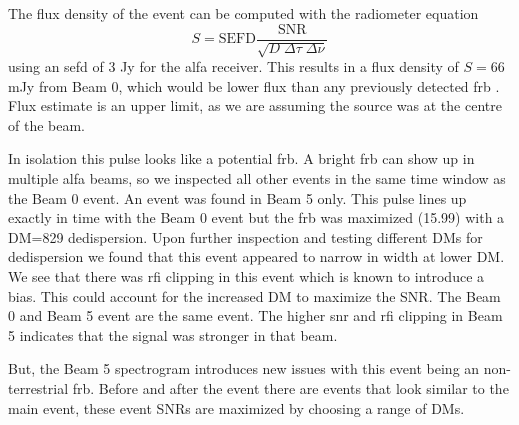 \documentclass[a4paper,fleqn,usenatbib]{mnras}
\begin{document}
%
The flux density of the event can be computed with the radiometer equation
%
$$
S = \textrm{SEFD} \frac{\textrm{SNR}}{\sqrt{D \; \Delta \tau \;
\Delta \nu}}
$$
%
using an \gls{sefd} of 3 Jy for the \gls{alfa} receiver. This results in a flux
density of $S = 66$ mJy from Beam 0, which would be lower flux than any
previously detected \gls{frb} \citep{2016PASA...33...45P}. Flux estimate is an
upper limit, as we are assuming the source was at the centre of the beam.

In isolation this pulse looks like a potential \gls{frb}. A bright \gls{frb} can
show up in multiple \gls{alfa} beams, so we inspected all other events in the
same time window as the Beam 0 event. An event was found in Beam 5 only. This
pulse lines up exactly in time with the Beam 0 event but the \gls{frb} was
maximized (15.99) with a DM=829 dedispersion. Upon further inspection and
testing different DMs for dedispersion we found that this event appeared to
narrow in width at lower DM. We see that there was \gls{rfi} clipping in this
event which is known to introduce a bias. This could account for the increased
DM to maximize the SNR. The Beam 0 and Beam 5 event are the same event. The
higher \gls{snr} and \gls{rfi} clipping in Beam 5 indicates that the signal was
stronger in that beam.

But, the Beam 5 spectrogram introduces new issues with this event being an
non-terrestrial \gls{frb}. Before and after the event there are events that look
similar to the main event, these event SNRs are maximized by choosing a range of
DMs.
\end{document}
